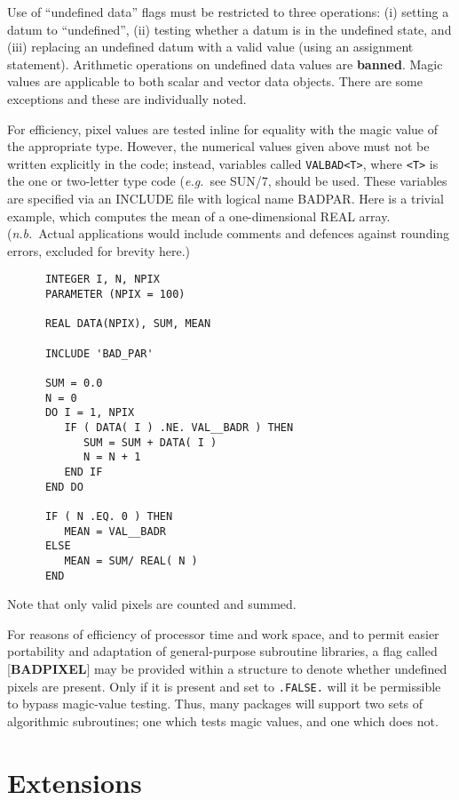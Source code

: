 \documentclass[twoside,11pt]{article}
\newcommand{\xref}[3]{#1}
\newcommand{\xlabel}[1]{}
\renewcommand{\_}{\texttt{\symbol{95}}}
\begin{document}
Use of ``undefined data'' flags must be restricted to three operations:
(i) setting a datum to ``undefined'', (ii) testing whether a datum is
in the undefined state, and (iii) replacing an undefined datum with a
valid value (using an assignment statement).  Arithmetic operations on
undefined data values are {\bf banned}.  Magic values are applicable to both
scalar and vector data objects.  There are some exceptions and these
are individually noted.

For efficiency, pixel values are tested inline for equality with the
magic value of the appropriate type.  However, the numerical values
given above must not be written explicitly in the code; instead,
variables called {\tt VAL\_\_BAD<T>}, where {\tt <T>} is the one or two-letter
type code ({\it e.g.}\  see \xref{SUN/7}{sun7}), should
be used.  These variables are specified
via an INCLUDE file with logical name BAD\_PAR.  Here is a trivial
example, which computes the mean of a one-dimensional REAL array.
({\it n.b.}\ Actual applications would include comments and
defences against rounding errors, excluded for brevity here.)

\goodbreak
\begin{verbatim}
      INTEGER I, N, NPIX
      PARAMETER (NPIX = 100)

      REAL DATA(NPIX), SUM, MEAN

      INCLUDE 'BAD_PAR'

      SUM = 0.0
      N = 0
      DO I = 1, NPIX
         IF ( DATA( I ) .NE. VAL__BADR ) THEN
            SUM = SUM + DATA( I )
            N = N + 1
         END IF
      END DO

      IF ( N .EQ. 0 ) THEN
         MEAN = VAL__BADR
      ELSE
         MEAN = SUM/ REAL( N )
      END
\end{verbatim}

Note that only valid pixels are counted and summed.

For reasons of efficiency of processor time and work space, and to
permit easier portability and adaptation of general-purpose subroutine
libraries, a flag called {[}{\bf BAD\_PIXEL}{]} may be
provided within a structure
to denote whether undefined pixels are present.  Only if it is present
and set to {\tt .FALSE.} will it be
permissible to bypass magic-value testing.  Thus, many packages
will support two sets of algorithmic subroutines; one which
tests magic values, and one which does not.

\section{\xlabel{se_exten}Extensions\label{se:exten}}
\end{document}
